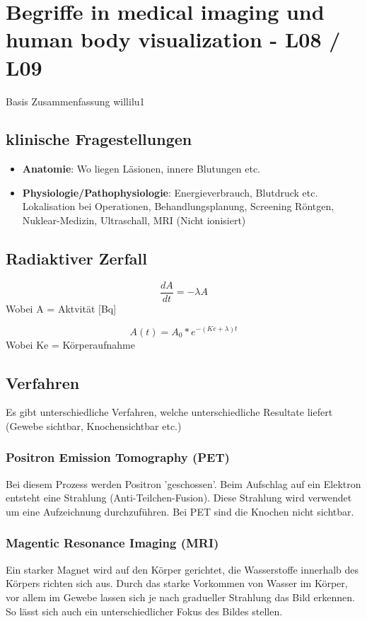 \documentclass{report}
\theoremstyle{definition}
\theoremstyle{example}
\begin{document}
\chapter{Begriffe in medical imaging und human body visualization - L08 / L09}
Basis Zusammenfassung willilu1

\section{klinische Fragestellungen}
\begin{itemize}
   \item \textbf{Anatomie}: Wo liegen Läsionen, innere Blutungen etc.
   \item \textbf{Physiologie/Pathophysiologie}: Energieverbrauch, Blutdruck etc.
   \subitem Lokalisation bei Operationen, Behandlungsplanung, Screening
   \subitem Röntgen, Nuklear-Medizin, Ultraschall, MRI (Nicht ionisiert) 
\end{itemize}

\section{Radiaktiver Zerfall}

\begin{equation}
   \frac{dA}{dt} = - \lambda A
\end{equation}
Wobei A = Aktvität [Bq]

\begin{equation}
   A(t) = A_0 * e^{-(Ke+\lambda)t}
\end{equation}
Wobei Ke = Körperaufnahme

\section{Verfahren}
Es gibt unterschiedliche Verfahren, welche unterschiedliche Resultate liefert (Gewebe sichtbar, Knochensichtbar etc.)
\subsection{Positron Emission Tomography (PET)}
Bei diesem Prozess werden Positron 'geschossen'. Beim Aufschlag auf ein Elektron entsteht eine Strahlung (Anti-Teilchen-Fusion). Diese Strahlung wird verwendet um eine Aufzeichnung durchzuführen. Bei PET sind die Knochen nicht sichtbar.

\subsection{Magentic Resonance Imaging (MRI)}
Ein starker Magnet wird auf den Körper gerichtet, die Wasserstoffe innerhalb des Körpers richten sich aus. Durch das starke Vorkommen von Wasser im Körper, vor allem im Gewebe lassen sich je nach gradueller Strahlung das Bild erkennen. So lässt sich auch ein unterschiedlicher Fokus des Bildes stellen.
\end{document}
